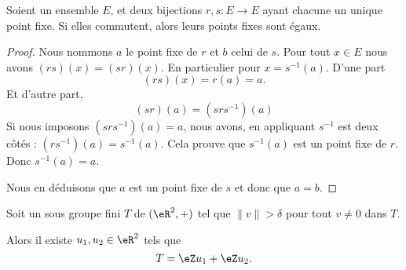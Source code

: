 \begin{lemma}       \label{LEMooWKTGooQlfuxm}
    Soient un ensemble \( E\), et deux bijections \( r,s\colon E\to E\) ayant chacune un unique point fixe. Si elles commutent, alors leurs points fixes sont égaux. 
\end{lemma}

\begin{proof}
    Nous nommons \( a\) le point fixe de \( r\) et \( b\) celui de \( s\). Pour tout \( x\in E\) nous avons \( (rs)(x)=(sr)(x)\). En particulier pour \( x=s^{-1}(a)\). D'une part
    \begin{equation}
        (rs)(x)=r(a)=a.
    \end{equation}
    Et d'autre part,
    \begin{equation}
        (sr)(a)=(srs^{-1})(a)
    \end{equation}
    Si nous imposons \( (srs^{-1})(a)=a\), nous avons, en appliquant \( s^{-1}\) est deux côtés : \( (rs^{-1})(a)=s^{-1}(a)\). Cela prouve que \( s^{-1}(a)\) est un point fixe de \( r\). Donc \( s^{-1}(a)=a\).

    Nous en déduisons que \( a\) est un point fixe de \( s\) et donc que \( a=b\).
\end{proof}

\begin{lemma}       \label{LEMooDGSJooCiBhZz}
    Soit un sous groupe fini \( T\) de \( (\eR^2,+)\) tel que \( \| v \|>\delta \) pour tout \( v\neq 0\) dans \( T\).

    Alors il existe \( u_1,u_2\in \eR^2\) tels que
    \begin{equation}
        T=\eZ u_1+\eZ u_2.
    \end{equation}
\end{lemma}

